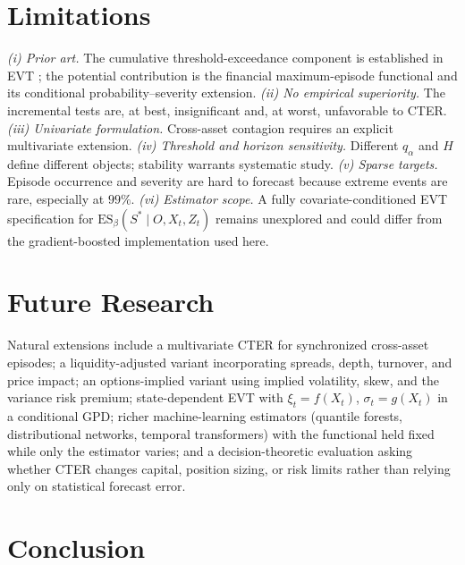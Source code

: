\documentclass[11pt]{article}
\newcommand{\ES}{\mathrm{ES}}
\begin{document}
\section{Limitations}\label{sec:limits}

\emph{(i) Prior art.} The cumulative threshold-exceedance component is established in EVT
\citep{anderson1994}; the potential contribution is the financial maximum-episode functional and its
conditional probability--severity extension. \emph{(ii) No empirical superiority.} The incremental tests
are, at best, insignificant and, at worst, unfavorable to CTER. \emph{(iii) Univariate formulation.}
Cross-asset contagion requires an explicit multivariate extension. \emph{(iv) Threshold and horizon
sensitivity.} Different $q_\alpha$ and $H$ define different objects; stability warrants systematic study.
\emph{(v) Sparse targets.} Episode occurrence and severity are hard to forecast because extreme events are
rare, especially at $99\%$. \emph{(vi) Estimator scope.} A fully covariate-conditioned EVT specification for
$\ES_\beta(S^{*}\mid O,X_t,Z_t)$ remains unexplored and could differ from the gradient-boosted
implementation used here.

\section{Future Research}\label{sec:future}

Natural extensions include a multivariate CTER for synchronized cross-asset episodes; a liquidity-adjusted
variant incorporating spreads, depth, turnover, and price impact; an options-implied variant using implied
volatility, skew, and the variance risk premium; state-dependent EVT with $\xi_t=f(X_t)$, $\sigma_t=g(X_t)$
in a conditional GPD; richer machine-learning estimators (quantile forests, distributional networks,
temporal transformers) with the functional held fixed while only the estimator varies; and a
decision-theoretic evaluation asking whether CTER changes capital, position sizing, or risk limits rather
than relying only on statistical forecast error.

\section{Conclusion}\label{sec:conclusion}
\end{document}
